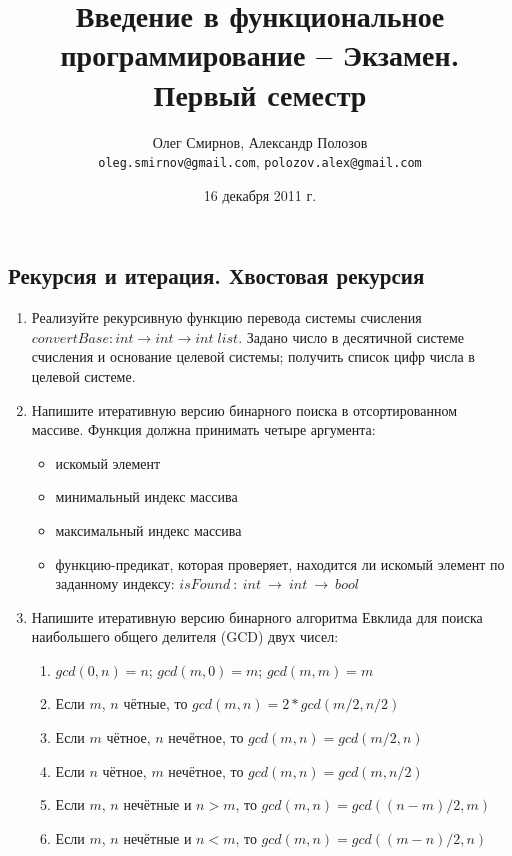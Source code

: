 \documentclass[a4paper,11pt]{article}
\author{Олег Смирнов, Александр Полозов \\
\texttt{oleg.smirnov@gmail.com}, \texttt{polozov.alex@gmail.com}}
\date{16 декабря 2011 г.}
\title{Введение в функциональное программирование -- Экзамен. Первый семестр}
\newcommand{\<}{\langle}
\renewcommand{\>}{\rangle}
\begin{document}
\subsection*{Рекурсия и итерация. Хвостовая рекурсия}
\begin{enumerate}
\item Реализуйте рекурсивную функцию перевода системы счисления 
  $convertBase: int \to int \to int\;list$. Задано число в десятичной системе
  счисления и основание целевой системы; получить список цифр числа в целевой
  системе.

\item Напишите итеративную версию бинарного поиска в отсортированном массиве.
  Функция должна принимать четыре аргумента:
  \begin{itemize}
  \item искомый элемент
  \item минимальный индекс массива
  \item максимальный индекс массива
  \item функцию-предикат, которая проверяет, находится ли искомый элемент по
    заданному индексу: $isFound~:~int~\rightarrow~int~\rightarrow~bool$
  \end{itemize}

\item Напишите итеративную версию бинарного алгоритма Евклида для поиска
  наибольшего общего делителя (GCD) двух чисел:
  \begin{enumerate}
  \item $gcd(0, n) = n$; $gcd(m, 0) = m$; $gcd(m, m) = m$
  \item Если $m$, $n$ чётные, то $gcd(m, n) = 2*gcd(m/2, n/2)$
  \item Если $m$ чётное, $n$ нечётное, то $gcd(m, n) = gcd(m/2, n)$
  \item Если $n$ чётное, $m$ нечётное, то $gcd(m, n) = gcd(m, n/2)$
  \item Если $m$, $n$ нечётные и $n > m$, то $gcd(m, n) = gcd((n - m)/2, m)$
  \item Если $m$, $n$ нечётные и $n < m$, то $gcd(m, n) = gcd((m - n)/2, n)$
  \end{enumerate}
\end{enumerate}
\end{document}
